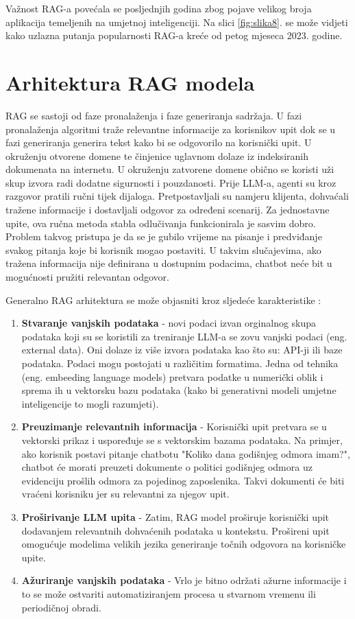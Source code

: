\documentclass[]{foi}
\begin{document}
Važnost RAG-a povećala se posljednjih godina zbog pojave velikog broja aplikacija temeljenih na umjetnoj inteligenciji. Na slici \ref{fig:slika8}. se može vidjeti kako uzlazna putanja popularnosti RAG-a kreće od petog mjeseca 2023. godine.


\section{Arhitektura RAG modela}
RAG se sastoji od faze pronalaženja i faze generiranja sadržaja. U fazi pronalaženja algoritmi traže relevantne informacije za korisnikov upit dok se u fazi generiranja generira tekst 
kako bi se odgovorilo na korisnički upit. U okruženju otvorene domene te činjenice uglavnom dolaze iz indeksiranih dokumenata na internetu. U okruženju zatvorene domene obično se koristi 
uži skup izvora radi dodatne sigurnosti i pouzdanosti. Prije LLM-a, agenti su kroz razgovor pratili ručni tijek dijaloga. Pretpostavljali su namjeru klijenta, dohvaćali tražene informacije 
i dostavljali odgovor za određeni scenarij. Za jednostavne upite, ova ručna metoda stabla odlučivanja funkcionirala je sasvim dobro. Problem takvog pristupa je da se je gubilo vrijeme na 
pisanje i predviđanje svakog pitanja koje bi korisnik mogao postaviti. U takvim slučajevima, ako tražena informacija nije definirana u dostupnim podacima, chatbot neće bit u mogućnosti 
pružiti relevantan odgovor\cite{ibmRAG}. 

Generalno RAG arhitektura se može objasniti kroz sljedeće karakteristike \cite{awsRAG2025}:

\begin{enumerate}
    \item \textbf{Stvaranje vanjskih podataka} - novi podaci izvan orginalnog skupa podataka koji su se koristili za treniranje LLM-a se zovu 
    vanjski podaci (eng. external data). Oni dolaze iz više izvora podataka kao što su: API-ji ili baze podataka. Podaci mogu postojati u različitim formatima.
    Jedna od tehnika (eng. embeeding language models) pretvara podatke u numerički oblik i sprema ih u vektorsku bazu podataka 
    (kako bi generativni modeli umjetne inteligencije to mogli razumjeti).
    \item \textbf{Preuzimanje relevantnih informacija} - Korisnički upit pretvara se u vektorski prikaz i uspoređuje se s vektorskim bazama podataka.
    Na primjer, ako korisnik postavi pitanje chatbotu "Koliko dana godišnjeg odmora imam?", chatbot će morati preuzeti dokumente o politici godišnjeg 
    odmora uz evidenciju prošlih odmora za pojedinog zaposlenika. Takvi dokumenti će biti vraćeni korisniku jer su relevantni za njegov upit.
    \item \textbf{Proširivanje LLM upita} - Zatim, RAG model proširuje korisnički upit dodavanjem relevantnih dohvaćenih podataka u kontekstu. 
    Prošireni upit omogućuje modelima velikih jezika generiranje točnih odgovora na korisničke upite.
    \item \textbf{Ažuriranje vanjskih podataka} - Vrlo je bitno održati ažurne informacije i to se može ostvariti automatiziranjem procesa u stvarnom vremenu ili periodičnoj obradi. 
\end{enumerate}
\end{document}
